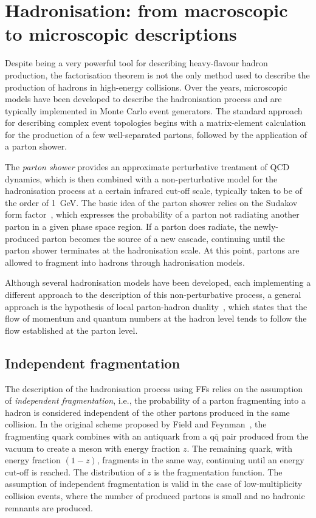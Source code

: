 \section{Hadronisation: from macroscopic to microscopic descriptions}
Despite being a very powerful tool for describing heavy-flavour hadron production, the factorisation theorem is not the only method used to describe the production of hadrons in high-energy collisions. Over the years, microscopic models have been developed to describe the hadronisation process and are typically implemented in Monte Carlo event generators. The standard approach for describing complex event topologies begins with a matrix-element calculation for the production of a few well-separated partons, followed by the application of a parton shower. 

The \emph{parton shower} provides an approximate perturbative treatment of QCD dynamics, which is then combined with a non-perturbative model for the hadronisation process at a certain infrared cut-off scale, typically taken to be of the order of 1~GeV. The basic idea of the parton shower relies on the Sudakov form factor~\cite{Sudakov:1954sw}, which expresses the probability of a parton not radiating another parton in a given phase space region. If a parton does radiate, the newly-produced parton becomes the source of a new cascade, continuing until the parton shower terminates at the hadronisation scale. At this point, partons are allowed to fragment into hadrons through hadronisation models. 

Although several hadronisation models have been developed, each implementing a different approach to the description of this non-perturbative process, a general approach is the hypothesis of local parton-hadron duality~\cite{Azimov:1984np}, which states that the flow of momentum and quantum numbers at the hadron level tends to follow the flow established at the parton level.

\subsection{Independent fragmentation}\label{sec:independent_fragmentation}
The description of the hadronisation process using FFs relies on the assumption of \emph{independent fragmentation}, i.e., the probability of a parton fragmenting into a hadron is considered independent of the other partons produced in the same collision. In the original scheme proposed by Field and Feynman~\cite{Field:1976ve}, the fragmenting quark combines with an antiquark from a $\mathrm{q\overline{q}}$ pair produced from the vacuum to create a meson with energy fraction $z$. The remaining quark, with energy fraction $(1-z)$, fragments in the same way, continuing until an energy cut-off is reached. The distribution of $z$ is the fragmentation function. The assumption of independent fragmentation is valid in the case of low-multiplicity \ee collision events, where the number of produced partons is small and no hadronic remnants are produced.
